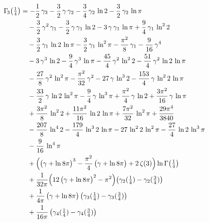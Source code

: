 \documentclass[11pt]{article}
\theoremstyle{remark}
\begin{document}
\begin{align*}
\Gamma_{\!3}\bigl(\tfrac14\bigr) &= -\frac{1}{2}\,\gamma_{3}-\frac{3}{2}\,\gamma\,\gamma_{2}-\frac{3}{4}\,\gamma_{2}\,\ln 2-\frac{3}{2}\,\gamma_{2}\,\ln \pi \\
 &\quad -\frac{3}{2}\,\gamma^{2}\,\gamma_{1}-\frac{3}{2}\,\gamma\,\gamma_{1}\,\ln 2-3\,\gamma\,\gamma_{1}\,\ln \pi+\frac{9}{4}\,\gamma_{1}\,\ln^{2} 2 \\
 &\quad -\frac{3}{2}\,\gamma_{1}\,\ln 2\,\ln \pi-\frac{3}{2}\,\gamma_{1}\,\ln^{2} \pi-\frac{\pi^{2}}{8}\,\gamma_{1}-\frac{9}{16}\,\gamma^{4} \\
 &\quad -3\,\gamma^{3}\,\ln 2-\frac{9}{4}\,\gamma^{3}\,\ln \pi-\frac{45}{4}\,\gamma^{2}\,\ln^{2} 2-\frac{51}{4}\,\gamma^{2}\,\ln 2\,\ln \pi \\
 &\quad -\frac{27}{8}\,\gamma^{2}\,\ln^{2} \pi-\frac{\pi^{2}}{32}\,\gamma^{2}-27\,\gamma\,\ln^{3} 2-\frac{153}{4}\,\gamma\,\ln^{2} 2\,\ln \pi \\
 &\quad -\frac{33}{2}\,\gamma\,\ln 2\,\ln^{2} \pi-\frac{9}{4}\,\gamma\,\ln^{3} \pi+\frac{\pi^{2}}{4}\,\gamma\,\ln 2+\frac{3\pi^{2}}{16}\,\gamma\,\ln \pi \\
 &\quad +\frac{3\pi^{2}}{8}\,\ln^{2} 2+\frac{11\pi^{2}}{16}\,\ln 2\,\ln \pi+\frac{7\pi^{2}}{32}\,\ln^{2} \pi+\frac{29\pi^{4}}{3840} \\
 &\quad -\frac{207}{8}\,\ln^{4} 2-\frac{179}{4}\,\ln^{3} 2\,\ln \pi-27\,\ln^{2} 2\,\ln^{2} \pi-\frac{27}{4}\,\ln 2\,\ln^{3} \pi \\
 &\quad -\frac{9}{16}\,\ln^{4} \pi \\
 &\quad +\Bigl(\bigl(\gamma+\ln 8\pi\bigr)^{3}-\frac{\pi^{2}}{4}\,\bigl(\gamma+\ln 8\pi\bigr)+2\,\zeta(3)\Bigr)\ln\Gamma\bigl(\tfrac14\bigr) \\
 &\quad +\frac{1}{32\pi}\Bigl(12\,\bigl(\gamma+\ln 8\pi\bigr)^{2}-\pi^{2}\Bigr)\bigl(\gamma_{2}(\tfrac14)-\gamma_{2}(\tfrac34)\bigr) \\
 &\quad +\frac{1}{4\pi}\,\bigl(\gamma+\ln 8\pi\bigr)\,\bigl(\gamma_{3}(\tfrac14)-\gamma_{3}(\tfrac34)\bigr) \\
 &\quad +\frac{1}{16\pi}\,\bigl(\gamma_{4}(\tfrac14)-\gamma_{4}(\tfrac34)\bigr)
\end{align*}
\end{document}
